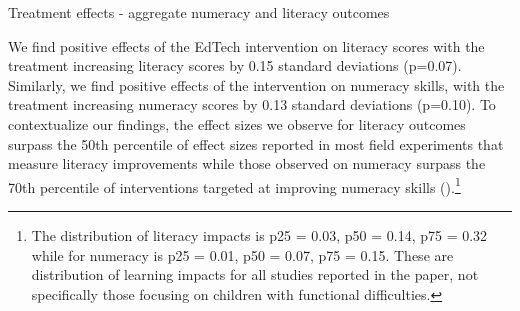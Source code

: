 \documentclass[hidelinks,12pt]{article}
\begin{document}
\begin{singlespace}
\begingroup
\setlength{\tabcolsep}{4pt}  %
\begin{table}[h!]
   \begin{singlespace}
    \centering
    \fontsize{12pt}{10pt}\selectfont  %
    \caption{Treatment effects - aggregate numeracy and literacy outcomes} \label{reg_main_outcomes}
    \end{singlespace}
\end{table}
\endgroup

We find positive effects of the EdTech intervention on literacy scores with the treatment increasing literacy scores by 0.15 standard deviations (p=0.07). Similarly, we find positive effects of the intervention on numeracy skills, with the treatment increasing numeracy scores by 0.13 standard deviations (p=0.10). To contextualize our findings, the effect sizes we observe for literacy outcomes surpass the 50th percentile of effect sizes reported in most field experiments that measure literacy improvements while those observed on numeracy surpass the 70th percentile of interventions targeted at improving numeracy skills (\cite{evans_how_2022}).\footnote{The distribution of literacy impacts is p25 = 0.03, p50 = 0.14, p75 = 0.32 while for numeracy is p25 = 0.01, p50 = 0.07, p75 = 0.15. These are distribution of learning impacts for all studies reported in the \textcite{evans_how_2022} paper, not specifically those focusing on children with functional difficulties.} 


\end{singlespace}
\end{document}
